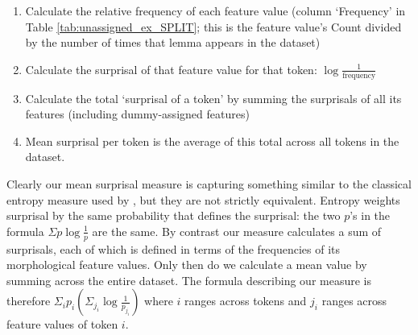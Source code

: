 \documentclass[USenglish]{article}
\begin{document}
\begin{enumerate}
\item Calculate the relative frequency of each feature value (column `Frequency' in Table \ref{tab:unassigned_ex_SPLIT}; this is the feature value's Count divided by the number of times that lemma appears in the dataset)
\item Calculate the surprisal of that feature value for that token: $\log{\frac{1}{\text{frequency}}}$
\item Calculate the total `surprisal of a token' by summing the surprisals of all its features (including dummy-assigned features)
\item Mean surprisal per token is the average of this total across all tokens in the dataset.

\end{enumerate}

Clearly our mean surprisal measure is capturing something similar to the classical entropy measure used by \citet{ccoltekin2023complexity}, but they are not strictly equivalent.
Entropy weights surprisal by the same probability that defines the surprisal: the two $p$'s in the formula $\Sigma p\log{\frac{1}{p}}$ are the same.
By contrast our measure calculates a sum of surprisals, each of which is defined in terms of the frequencies of its morphological feature values.
Only then do we calculate a mean value by summing across the entire dataset.
The formula describing our measure is therefore $\Sigma_i p_i \left( \Sigma_{j_i} \log{\frac{1}{p_{j_i}}} \right)$ where $i$ ranges across tokens and $j_i$ ranges across feature values of token $i$.
\end{document}
